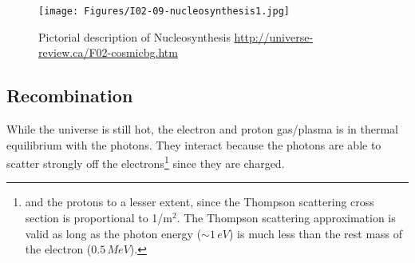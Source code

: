 





\begin{figure}[h]
\centering
\texttt{[image: Figures/I02-09-nucleosynthesis1.jpg]}
\caption{Pictorial description of Nucleosynthesis \url{http://universe-review.ca/F02-cosmicbg.htm}}
\label{fig:Neutrons}
\end{figure}


\subsection{Recombination}
While the universe is still hot, the electron and proton gas/plasma is in thermal equilibrium with the photons. They interact because the photons are able to scatter strongly off the electrons\footnote{and the protons to a lesser extent, since the Thompson scattering cross section is proportional to 1/m$^2$. The Thompson scattering approximation is valid as long as the photon 
energy ($\sim 1\,eV$) is much less than the rest mass of the 
electron ($0.5\,MeV$).} since they are charged.

